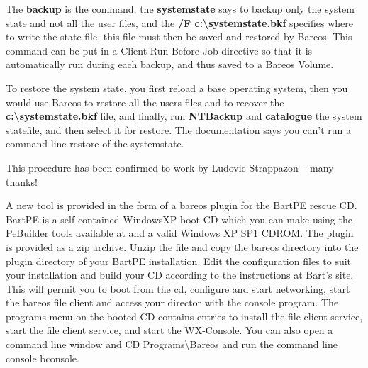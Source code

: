The {\bf backup} is the command, the {\bf systemstate} says to backup only the
system state and not all the user files, and the {\bf /F
c:\textbackslash{}systemstate.bkf} specifies where to write the state file.
this file must then be saved and restored by Bareos. This command
can be put in a Client Run Before Job directive so that it is automatically
run during each backup, and thus saved to a Bareos Volume.

To restore the system state, you first reload a base operating system, then
you would use Bareos to restore all the users files and to recover the {\bf
c:\textbackslash{}systemstate.bkf} file, and finally, run {\bf NTBackup} and
{\bf catalogue} the system statefile, and then select it for restore. The
documentation says you can't run a command line restore of the systemstate.

This procedure has been confirmed to work by Ludovic Strappazon -- many
thanks!

A new tool is provided in the form of a bareos plugin for the BartPE rescue
CD. BartPE is a self-contained WindowsXP boot CD which you can make using the
PeBuilder tools available at
 and a valid
Windows XP SP1 CDROM. The plugin is provided as a zip archive. Unzip the file
and copy the bareos directory into the plugin directory of your BartPE
installation. Edit the configuration files to suit your installation and build
your CD according to the instructions at Bart's site. This will permit you to
boot from the cd, configure and start networking, start the bareos file client
and access your director with the console program. The programs menu on the
booted CD contains entries to install the file client service, start the file
client service, and start the WX-Console. You can also open a command line
window and CD Programs\textbackslash{}Bareos and run the command line console
bconsole.
